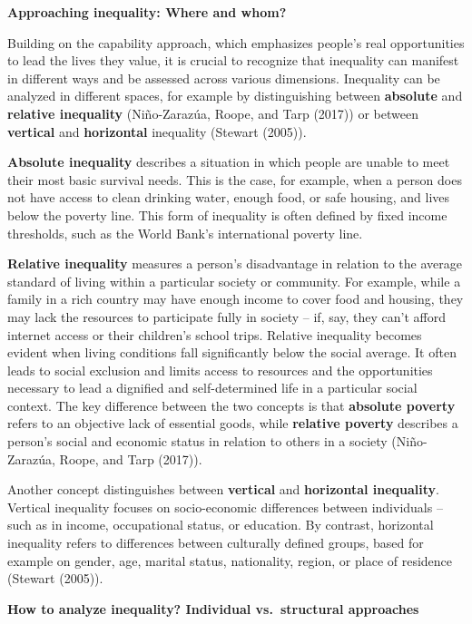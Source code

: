 \documentclass[
  a4paper,
  openany]{book}
\begin{document}
\textbf{Approaching inequality: Where and whom?}

Building on the capability approach, which emphasizes people's real
opportunities to lead the lives they value, it is crucial to recognize
that inequality can manifest in different ways and be assessed across
various dimensions. Inequality can be analyzed in different spaces, for
example by distinguishing between \textbf{absolute} and \textbf{relative
inequality} (Niño-Zarazúa, Roope, and Tarp (2017)) or between
\textbf{vertical} and \textbf{horizontal} inequality (Stewart (2005)).

\textbf{Absolute inequality} describes a situation in which people are
unable to meet their most basic survival needs. This is the case, for
example, when a person does not have access to clean drinking water,
enough food, or safe housing, and lives below the poverty line. This
form of inequality is often defined by fixed income thresholds, such as
the World Bank's international poverty line.

\textbf{Relative inequality} measures a person's disadvantage in
relation to the average standard of living within a particular society
or community. For example, while a family in a rich country may have
enough income to cover food and housing, they may lack the resources to
participate fully in society -- if, say, they can't afford internet
access or their children's school trips. Relative inequality becomes
evident when living conditions fall significantly below the social
average. It often leads to social exclusion and limits access to
resources and the opportunities necessary to lead a dignified and
self-determined life in a particular social context. The key difference
between the two concepts is that \textbf{absolute poverty} refers to an
objective lack of essential goods, while \textbf{relative poverty}
describes a person's social and economic status in relation to others in
a society (Niño-Zarazúa, Roope, and Tarp (2017)).

Another concept distinguishes between \textbf{vertical} and
\textbf{horizontal inequality}. Vertical inequality focuses on
socio-economic differences between individuals -- such as in income,
occupational status, or education. By contrast, horizontal inequality
refers to differences between culturally defined groups, based for
example on gender, age, marital status, nationality, region, or place of
residence (Stewart (2005)).

\textbf{How to analyze inequality? Individual vs.~structural approaches}
\end{document}
